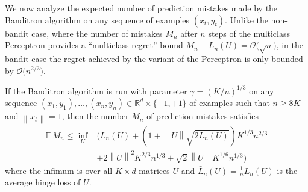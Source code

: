 \documentclass[11pt]{hackednow}
\newcommand{\E}{\mathbb{E}}
\newcommand{\R}{\mathbb{R}}
\newcommand{\norm}[1]{\left\|{#1}\right\|}
\begin{document}
We now analyze the expected number of prediction mistakes made by the Banditron algorithm on any sequence of examples $(x_t,y_t)$. Unlike the non-bandit case, where the number of mistakes $M_n$
after $n$ steps of the multiclass Perceptron provides a ``multiclass regret'' bound $M_n - L_n(U) = \mathcal{O}\bigl(\sqrt{n}\bigr)$, in the bandit case the regret achieved by the variant of the Perceptron is only bounded by $\mathcal{O}\bigl(n^{2/3}\bigr)$.
%
\begin{theorem}
If the Banditron algorithm is run with parameter $\gamma = (K/n)^{1/3}$ on any sequence $(x_1,y_1),\dots,(x_n,y_n) \in \R^d\times\{-1,+1\}$ of examples such that $n \ge 8K$ and $\norm{x_t} = 1$, then the number $M_n$ of prediction mistakes satisfies
\begin{align*}
    \E\,M_n
\le
    \inf_{U}&\biggl( L_n(U) + \left(1 + \norm{U}\sqrt{2\bar{L}_n(U)}\right)K^{1/3}n^{2/3}
\\ &+ 2\norm{U}^2 K^{2/3}n^{1/3} + \sqrt{2}\norm{U} K^{1/6}n^{1/3}\biggr)
\end{align*}
where the infimum is over all $K \times d$ matrices $U$ and $\bar{L}_n(U) = \tfrac{1}{n}L_n(U)$ is the average hinge loss of $U$.
\end{theorem}
%
\end{document}
